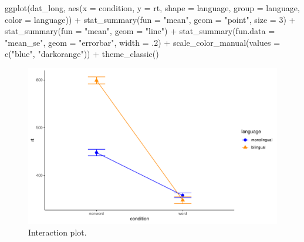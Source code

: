 \documentclass[
  english,
  doc,floatsintext]{apa6}
\newenvironment{Shaded}{\begin{snugshade}}{\end{snugshade}}
\newcommand{\AttributeTok}[1]{\textcolor[rgb]{0.77,0.63,0.00}{#1}}
\newcommand{\DecValTok}[1]{\textcolor[rgb]{0.00,0.00,0.81}{#1}}
\newcommand{\FunctionTok}[1]{\textcolor[rgb]{0.00,0.00,0.00}{#1}}
\newcommand{\NormalTok}[1]{#1}
\newcommand{\SpecialCharTok}[1]{\textcolor[rgb]{0.00,0.00,0.00}{#1}}
\newcommand{\StringTok}[1]{\textcolor[rgb]{0.31,0.60,0.02}{#1}}
\begin{document}
\begin{Shaded}
\begin{Highlighting}[]
\FunctionTok{ggplot}\NormalTok{(dat\_long, }\FunctionTok{aes}\NormalTok{(}\AttributeTok{x =}\NormalTok{ condition, }\AttributeTok{y =}\NormalTok{ rt, }
                     \AttributeTok{shape =}\NormalTok{ language,}
                     \AttributeTok{group =}\NormalTok{ language,}
                     \AttributeTok{color =}\NormalTok{ language)) }\SpecialCharTok{+}
  \FunctionTok{stat\_summary}\NormalTok{(}\AttributeTok{fun =} \StringTok{"mean"}\NormalTok{, }\AttributeTok{geom =} \StringTok{"point"}\NormalTok{, }\AttributeTok{size =} \DecValTok{3}\NormalTok{) }\SpecialCharTok{+}
  \FunctionTok{stat\_summary}\NormalTok{(}\AttributeTok{fun =} \StringTok{"mean"}\NormalTok{, }\AttributeTok{geom =} \StringTok{"line"}\NormalTok{) }\SpecialCharTok{+}
  \FunctionTok{stat\_summary}\NormalTok{(}\AttributeTok{fun.data =} \StringTok{"mean\_se"}\NormalTok{, }\AttributeTok{geom =} \StringTok{"errorbar"}\NormalTok{, }\AttributeTok{width =}\NormalTok{ .}\DecValTok{2}\NormalTok{) }\SpecialCharTok{+}
  \FunctionTok{scale\_color\_manual}\NormalTok{(}\AttributeTok{values =} \FunctionTok{c}\NormalTok{(}\StringTok{"blue"}\NormalTok{, }\StringTok{"darkorange"}\NormalTok{)) }\SpecialCharTok{+}
  \FunctionTok{theme\_classic}\NormalTok{()}
\end{Highlighting}
\end{Shaded}

\begin{figure}

{\centering \includegraphics[width=1\linewidth]{images/ixn-1} 

}

\caption{Interaction plot.}\label{fig:ixn}
\end{figure}
\end{document}
